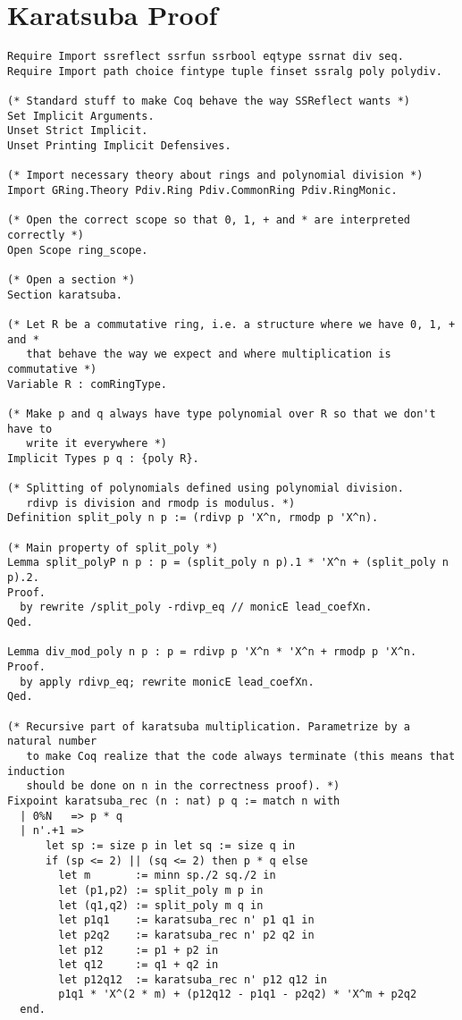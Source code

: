 \section{Karatsuba Proof}
\begin{verbatim}
Require Import ssreflect ssrfun ssrbool eqtype ssrnat div seq.
Require Import path choice fintype tuple finset ssralg poly polydiv.

(* Standard stuff to make Coq behave the way SSReflect wants *)
Set Implicit Arguments.
Unset Strict Implicit.
Unset Printing Implicit Defensives.

(* Import necessary theory about rings and polynomial division *)
Import GRing.Theory Pdiv.Ring Pdiv.CommonRing Pdiv.RingMonic.

(* Open the correct scope so that 0, 1, + and * are interpreted correctly *)
Open Scope ring_scope.

(* Open a section *)
Section karatsuba.

(* Let R be a commutative ring, i.e. a structure where we have 0, 1, + and *
   that behave the way we expect and where multiplication is commutative *)
Variable R : comRingType.

(* Make p and q always have type polynomial over R so that we don't have to
   write it everywhere *)
Implicit Types p q : {poly R}.

(* Splitting of polynomials defined using polynomial division.
   rdivp is division and rmodp is modulus. *)
Definition split_poly n p := (rdivp p 'X^n, rmodp p 'X^n).

(* Main property of split_poly *)
Lemma split_polyP n p : p = (split_poly n p).1 * 'X^n + (split_poly n p).2.
Proof.
  by rewrite /split_poly -rdivp_eq // monicE lead_coefXn.
Qed.

Lemma div_mod_poly n p : p = rdivp p 'X^n * 'X^n + rmodp p 'X^n.
Proof.
  by apply rdivp_eq; rewrite monicE lead_coefXn.
Qed.

(* Recursive part of karatsuba multiplication. Parametrize by a natural number
   to make Coq realize that the code always terminate (this means that induction
   should be done on n in the correctness proof). *)
Fixpoint karatsuba_rec (n : nat) p q := match n with
  | 0%N   => p * q
  | n'.+1 =>
      let sp := size p in let sq := size q in
      if (sp <= 2) || (sq <= 2) then p * q else
        let m       := minn sp./2 sq./2 in
        let (p1,p2) := split_poly m p in
        let (q1,q2) := split_poly m q in
        let p1q1    := karatsuba_rec n' p1 q1 in
        let p2q2    := karatsuba_rec n' p2 q2 in
        let p12     := p1 + p2 in
        let q12     := q1 + q2 in
        let p12q12  := karatsuba_rec n' p12 q12 in
        p1q1 * 'X^(2 * m) + (p12q12 - p1q1 - p2q2) * 'X^m + p2q2
  end.


\end{verbatim}
